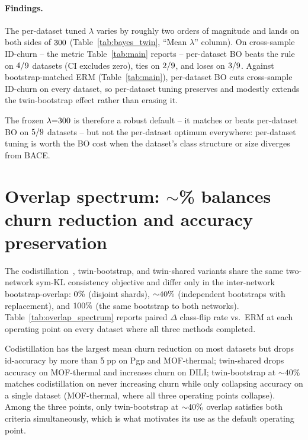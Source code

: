 \paragraph{Findings.}
The per-dataset tuned $\lambda$ varies by roughly two orders of
magnitude and lands on both sides of $300$
(Table~\ref{tab:bayes_twin}, ``Mean $\lambda$'' column).  On
cross-sample ID-churn -- the metric Table~\ref{tab:main} reports --
per-dataset BO beats the rule on
$4/9$ datasets (CI excludes
zero), ties on $2/9$, and
loses on $3/9$.  Against
bootstrap-matched ERM (Table~\ref{tab:main}), per-dataset BO cuts
cross-sample ID-churn on every dataset, so per-dataset tuning
preserves and modestly extends the twin-bootstrap effect rather than
erasing it.

The frozen $\lambda{=}300$ is therefore a robust default --
it matches or beats per-dataset BO on
$5/9$ datasets -- but not
the per-dataset optimum everywhere: per-dataset tuning is worth the
BO cost when the dataset's class structure or size diverges from
BACE.



\section{\boldmath Overlap spectrum: $\sim$\overlapPctMid\% balances churn reduction and accuracy preservation}
\label{app:overlap_spectrum}

The codistillation~\citep{anil2018large},
twin-bootstrap, and twin-shared variants share the same two-network
sym-KL consistency objective and differ only in the inter-network
bootstrap-overlap: $0\%$ (disjoint shards),
${\sim}40\%$ (independent bootstraps with replacement),
and $100\%$ (the same bootstrap to
both networks).  Table~\ref{tab:overlap_spectrum} reports paired
$\Delta$ class-flip rate vs.\ ERM at each operating point on every dataset
where all three methods completed.



Codistillation has the largest mean churn reduction on most datasets
but drops id-accuracy by more than $5$\,pp on Pgp and
MOF-thermal; twin-shared drops accuracy on MOF-thermal and increases
churn on DILI; twin-bootstrap at ${\sim}40\%$ matches codistillation
on never increasing churn while only collapsing accuracy on a single
dataset (MOF-thermal, where all three operating points collapse).  Among the three points, only twin-bootstrap at
${\sim}40\%$ overlap satisfies both criteria
simultaneously, which is what motivates its use as the default
operating point.

